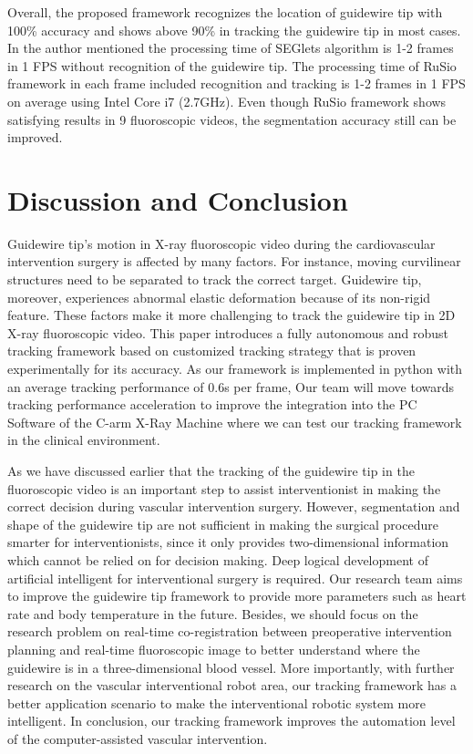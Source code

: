 \documentclass[journal]{IEEEtran}
\begin{document}
Overall, the proposed framework recognizes  the location of guidewire tip with 100\% accuracy and shows above 90\% in tracking the guidewire tip in most cases. In  \cite{vandini2017robust} the author mentioned the processing time of  SEGlets algorithm is 1-2 frames in 1 FPS without recognition of the guidewire tip. The processing time of RuSio framework in each frame included recognition and tracking is 1-2 frames in 1 FPS on average using Intel Core i7 (2.7GHz). Even though RuSio framework shows satisfying results in 9 fluoroscopic videos, the segmentation accuracy still can be improved.



\section{Discussion and Conclusion}
Guidewire tip's motion in X-ray fluoroscopic video during the cardiovascular intervention surgery is affected by many factors. For instance, moving curvilinear structures need to be separated to track the correct target. Guidewire tip, moreover, experiences abnormal elastic deformation because of its non-rigid feature. These factors make it more challenging to track the guidewire tip in 2D X-ray fluoroscopic video. This paper introduces a fully autonomous and robust tracking framework based on customized tracking strategy that is proven experimentally for its accuracy. As our framework is implemented in python with an average tracking performance of 0.6s per frame, Our team will move towards tracking performance acceleration to improve the integration into the PC Software of the C-arm X-Ray Machine where we can test our tracking framework in the clinical environment. 

As we have discussed earlier that the tracking of the guidewire tip in the fluoroscopic video is an important step to assist interventionist in making the correct decision during vascular intervention surgery. However, segmentation and shape of the guidewire tip are not sufficient in making the surgical procedure smarter for interventionists, since it only provides two-dimensional information which cannot be relied on for decision making. Deep logical development of artificial intelligent for interventional surgery is required. Our research team aims to improve the guidewire tip framework to provide more parameters such as heart rate and body temperature in the future. Besides, we should focus on the research problem on real-time co-registration between preoperative intervention planning and real-time fluoroscopic image to better understand where the guidewire is in a three-dimensional blood vessel. More importantly, with further research on the vascular interventional robot area, our tracking framework has a better application scenario to make the interventional robotic system more intelligent. In conclusion, our tracking framework improves the automation level of the computer-assisted vascular intervention.
\end{document}
